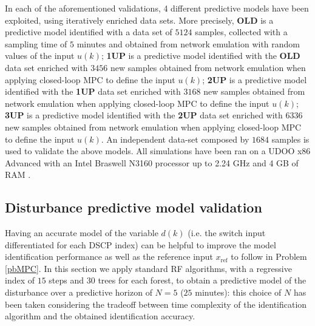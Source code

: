 In each of the aforementioned validations, 4 different predictive models have been exploited, using iteratively enriched data sets. More precisely, \textbf{OLD} is a predictive model identified with a data set of $5124$ samples, collected with a sampling time of $5$ minutes and obtained from network emulation with random values of the input $u(k)$; \textbf{1UP} is a predictive model identified with the \textbf{OLD} data set enriched with $3456$ new samples obtained from network emulation when applying closed-loop MPC to define the input $u(k)$; \textbf{2UP} is a predictive model identified with the \textbf{1UP} data set enriched with $3168$ new samples obtained from network emulation when applying closed-loop MPC to define the input $u(k)$; \textbf{3UP} is a predictive model identified with the \textbf{2UP} data set enriched with $6336$ new samples obtained from network emulation when applying closed-loop MPC to define the input $u(k)$. An independent data-set composed by $1684$ samples is used to validate the above models.
All simulations have been ran on a UDOO x86 Advanced with an Intel Braswell N3160 processor up to 2.24 GHz and 4 GB of RAM \cite{UDOO}.

\subsection {Disturbance predictive model validation} Having an accurate model of the variable $d(k)$ (i.e. the switch input differentiated for each DSCP index) can be helpful to improve the model identification performance as well as the reference input $x_\mathrm{ref}$ to follow in Problem \ref{pbMPC}. In this section we apply standard RF algorithms, with a regressive index of $15$ steps and $30$ trees for each forest, to obtain a predictive model of the disturbance over a predictive horizon of $N=5$ ($25$ minutes): this choice of $N$ has been taken considering the tradeoff between time complexity of the identification algorithm and the obtained identification accuracy. 

